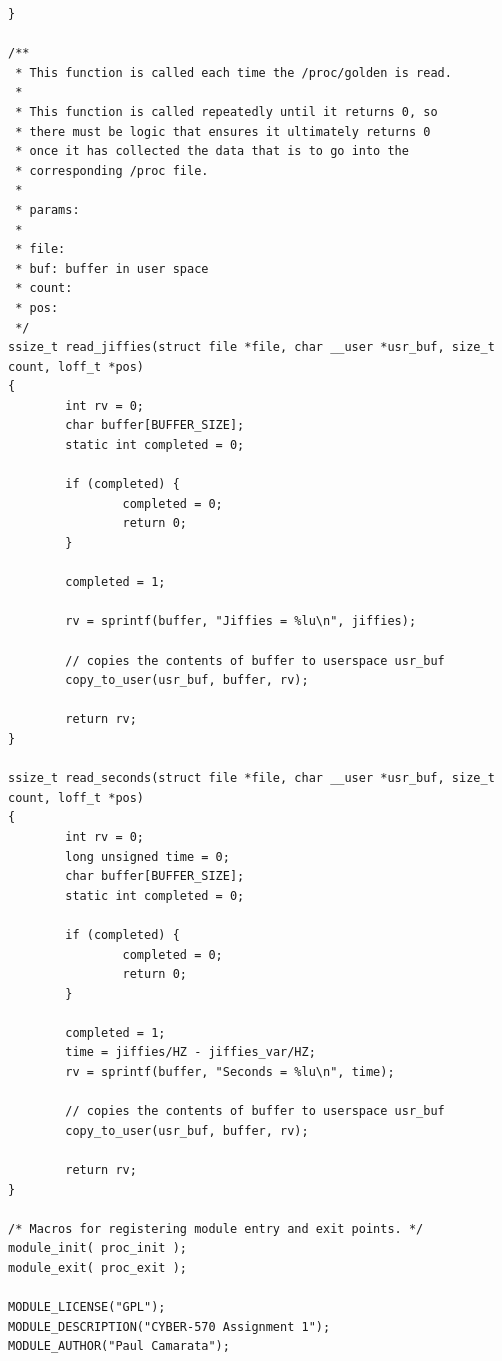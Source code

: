 \documentclass[10pt]{article}
\begin{document}
\begin{verbatim}
}

/**
 * This function is called each time the /proc/golden is read.
 * 
 * This function is called repeatedly until it returns 0, so
 * there must be logic that ensures it ultimately returns 0
 * once it has collected the data that is to go into the 
 * corresponding /proc file.
 *
 * params:
 *
 * file:
 * buf: buffer in user space
 * count:
 * pos:
 */
ssize_t read_jiffies(struct file *file, char __user *usr_buf, size_t count, loff_t *pos)
{
        int rv = 0;
        char buffer[BUFFER_SIZE];
        static int completed = 0;

        if (completed) {
                completed = 0;
                return 0;
        }

        completed = 1;

        rv = sprintf(buffer, "Jiffies = %lu\n", jiffies);

        // copies the contents of buffer to userspace usr_buf
        copy_to_user(usr_buf, buffer, rv);

        return rv;
}

ssize_t read_seconds(struct file *file, char __user *usr_buf, size_t count, loff_t *pos)
{
        int rv = 0;
        long unsigned time = 0;
        char buffer[BUFFER_SIZE];
        static int completed = 0;

        if (completed) {
                completed = 0;
                return 0;
        }

        completed = 1;
        time = jiffies/HZ - jiffies_var/HZ;
        rv = sprintf(buffer, "Seconds = %lu\n", time);

        // copies the contents of buffer to userspace usr_buf
        copy_to_user(usr_buf, buffer, rv);

        return rv;
}

/* Macros for registering module entry and exit points. */
module_init( proc_init );
module_exit( proc_exit );

MODULE_LICENSE("GPL");
MODULE_DESCRIPTION("CYBER-570 Assignment 1");
MODULE_AUTHOR("Paul Camarata");

\end{verbatim}
\end{document}
